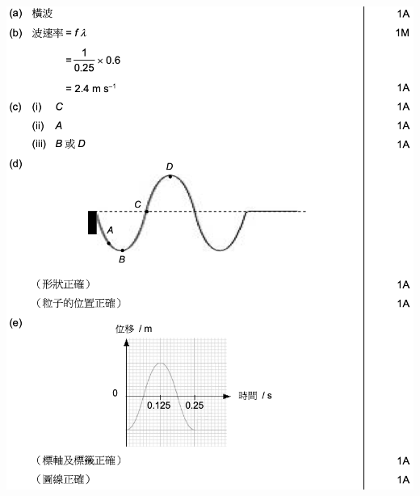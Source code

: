 {
}{
    \sol\par{\par\centering\includegraphics[width=\textwidth]{./img/ch1_earlyclass_wave_lq_2024-05-13-13-24-37.png}\par}
}

